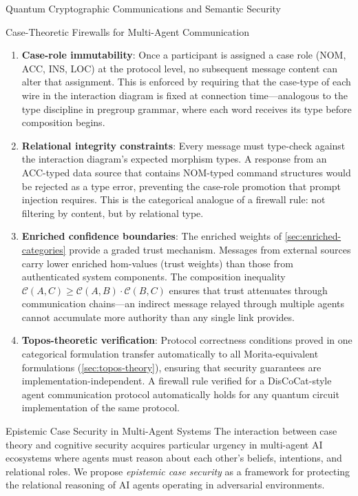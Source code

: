 \documentclass[
  ignorenonframetext,
]{beamer}
\begin{document}
\begin{frame}{Quantum Cryptographic Communications and Semantic
Security}
\begin{block}{Case-Theoretic Firewalls for Multi-Agent Communication}
\begin{enumerate}
\item
  \textbf{Case-role immutability}: Once a participant is assigned a case
  role (NOM, ACC, INS, LOC) at the protocol level, no subsequent message
  content can alter that assignment. This is enforced by requiring that
  the case-type of each wire in the interaction diagram is fixed at
  connection time---analogous to the type discipline in pregroup
  grammar, where each word receives its type before composition begins.
\item
  \textbf{Relational integrity constraints}: Every message must
  type-check against the interaction diagram's expected morphism types.
  A response from an ACC-typed data source that contains NOM-typed
  command structures would be rejected as a type error, preventing the
  case-role promotion that prompt injection requires. This is the
  categorical analogue of a firewall rule: not filtering by content, but
  by relational type.
\item
  \textbf{Enriched confidence boundaries}: The enriched weights of
  \autoref{sec:enriched-categories} provide a graded trust mechanism.
  Messages from external sources carry lower enriched hom-values (trust
  weights) than those from authenticated system components. The
  composition inequality
  \(\mathcal{C}(A,C) \geq \mathcal{C}(A,B) \cdot \mathcal{C}(B,C)\)
  ensures that trust attenuates through communication chains---an
  indirect message relayed through multiple agents cannot accumulate
  more authority than any single link provides.
\item
  \textbf{Topos-theoretic verification}: Protocol correctness conditions
  proved in one categorical formulation transfer automatically to all
  Morita-equivalent formulations (\autoref{sec:topos-theory}), ensuring
  that security guarantees are implementation-independent. A firewall
  rule verified for a DisCoCat-style agent communication protocol
  automatically holds for any quantum circuit implementation of the same
  protocol.
\end{enumerate}
\end{block}

\begin{block}{Epistemic Case Security in Multi-Agent Systems}
\protect{}\label{epistemic-case-security-in-multi-agent-systems}
The interaction between case theory and cognitive security acquires
particular urgency in multi-agent AI ecosystems where agents must reason
about each other's beliefs, intentions, and relational roles. We propose
\emph{epistemic case security} as a framework for protecting the
relational reasoning of AI agents operating in adversarial environments.


\end{block}
\end{frame}
\end{document}
